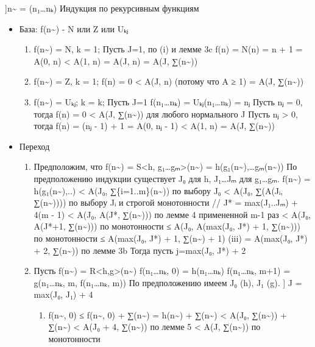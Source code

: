 \documentclass[11pt]{article}
\begin{document}
]n\textasciitilde{} = (n₁\ldots{}nₖ)
Индукция по рекурсивным функциям
\begin{itemize}
\item База:
f(n\textasciitilde{}) - N или Z или Uₖⱼ
\begin{enumerate}
\item f(n\textasciitilde{}) = N, k = 1; Пусть J=1, по (i) и лемме 3c
f(n) = N(n) = n + 1 = A(0, n) < A(1, n) = A(J, n) = A(J, ∑(n\textasciitilde{}))
\item f(n\textasciitilde{}) = Z, k = 1;
f(n) = 0 < A(J, n) (потому что A ≥ 1) = A(J, ∑(n\textasciitilde{}))
\item f(n\textasciitilde{}) = Uₖⱼ; k = k; Пусть J=1
f(n₁\ldots{}nₖ) = Uₖⱼ(n₁\ldots{}nₖ) = nⱼ
Пусть nⱼ = 0, тогда f(n) = 0 < A(J, ∑(n\textasciitilde{})) для любого нормального J
Пусть nⱼ > 0, тогда f(n) = (nⱼ - 1) + 1 = A(0, nⱼ - 1) < A(1, n)
= A(J, ∑(n\textasciitilde{}))
\end{enumerate}
\item Переход
\begin{enumerate}
\item Предположим, что f(n\textasciitilde{}) = S<h, g₁\ldots{}gₘ>(n\textasciitilde{}) = h(g₁(n\textasciitilde{}),\ldots{}gₘ(n\textasciitilde{}))
По предположению индукции существует J₀ для h, J₁\ldots{}Jₘ для g₁\ldots{}gₘ.
f(n\textasciitilde{}) = h(g₁(n\textasciitilde{}),..)
< A(J₀, ∑\{i=1..m\}(n\textasciitilde{}))            по выбору J₀
< A(J₀, ∑(A(Jᵢ, ∑(n\textasciitilde{}))))           по выбору Jᵢ и строгой монотонности
// J* = max(J₁..Jₘ) + 4(m - 1)
< A(J₀, A(J*, ∑(n\textasciitilde{})))             по лемме 4 примененной m-1 раз
< A(J₀, A(J*+1, ∑(n\textasciitilde{})))           по монотонности
≤ A(J₀, A(max(J₀, J*) + 1, ∑(n\textasciitilde{}))) по монотонности
≤ A(max(J₀, J*) + 1, ∑(n\textasciitilde{}) + 1)   (iii)
= A(max(J₀, J*) + 2, ∑(n\textasciitilde{}))       по лемме 3b
Тогда пусть j=max(J₀, J*) + 2
\item Пусть f(n\textasciitilde{}) = R<h,g>(n\textasciitilde{})
f(n₁\ldots{}nₖ, 0) = h(n₁\ldots{}nₖ)
f(n₁\ldots{}nₖ, m+1) = g(n₁\ldots{}nₖ, m, f(n₁\ldots{}nₖ, m))
По предположению имеем J₀ (h), J₁ (g).
] J = max(J₀, J₁) + 4
\begin{enumerate}
\item f(n\textasciitilde{}, 0)
≤ f(n\textasciitilde{}, 0) + ∑(n\textasciitilde{})
= h(n\textasciitilde{}) + ∑(n\textasciitilde{})
< A(J₀, ∑(n\textasciitilde{})) + ∑(n\textasciitilde{})
< A(J₀ + 4, ∑(n\textasciitilde{}))                   по лемме 5
< A(J, ∑(n\textasciitilde{}))                       по монотонности

\end{enumerate}
\end{enumerate}
\end{itemize}
\end{document}
